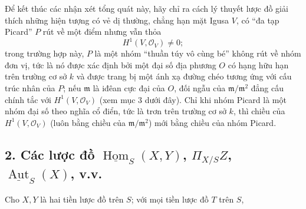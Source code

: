 \documentclass[11pt,twoside,openany]{book}
\numberwithin{equation}{section}
\begin{document}
Để kết thúc các nhận xét tổng quát này, hãy chỉ ra cách lý thuyết lược đồ giải
thích những hiện tượng có vẻ dị thường, chẳng hạn mặt Igusa $V$, có ``đa tạp
Picard'' $P$ rút về một điểm nhưng vẫn thỏa
\[
  H^1(V,\mathcal O_V)\ne 0 ;
\]
trong trường hợp này, $P$ là một nhóm ``thuần túy vô cùng bé'' không rút về
nhóm đơn vị, tức là nó được xác định bởi một đại số địa phương $O$ có hạng hữu
hạn trên trường cơ sở $k$ và được trang bị một ánh xạ đường chéo tương ứng với
cấu trúc nhân của $P$; nếu $\mathfrak m$ là iđêan cực đại của $O$, đối ngẫu của
$\mathfrak m/\mathfrak m^2$ đẳng cấu chính tắc với
$H^1(V,\mathcal O_V)$ (xem mục 3 dưới đây). Chỉ khi nhóm Picard là một nhóm
đại số theo nghĩa cổ điển, tức là trơn trên trường cơ sở $k$, thì chiều của
$H^1(V,\mathcal O_V)$ (luôn bằng chiều của $\mathfrak m/\mathfrak m^2$) mới
bằng chiều của nhóm Picard.

\subsection*{2. Các lược đồ $\underline{\operatorname{Hom}}_S(X,Y)$,
$\Pi_{X/S}Z$, $\underline{\operatorname{Aut}}_S(X)$, v.v.}

Cho $X,Y$ là hai tiền lược đồ trên $S$; với mọi tiền lược đồ $T$ trên $S$,
\end{document}
